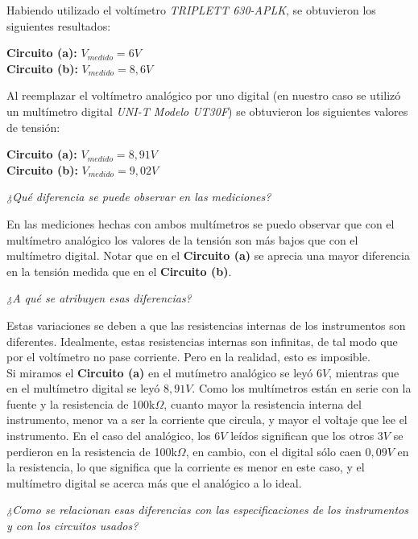 \documentclass{article}
\begin{document}
\noindent Habiendo utilizado el voltímetro \textit{TRIPLETT 630-APLK}, se obtuvieron los siguientes resultados:
\bigskip

	\indent \textbf{Circuito (a):} $V_{medido} = 6V$ \smallskip\\
	\indent \textbf{Circuito (b):} $V_{medido} = 8,6V$ \\
	\medskip

	Al reemplazar el voltímetro analógico por uno digital (en nuestro caso se utilizó un multímetro digital \textit{UNI-T Modelo UT30F}) se obtuvieron los siguientes valores de tensión:
\bigskip

	\indent \textbf{Circuito (a):} $V_{medido} = 8,91V$ \smallskip\\
	\indent \textbf{Circuito (b):} $V_{medido} = 9,02V$ \\
	\bigskip

\newpage
\textit{¿Qué diferencia se puede observar en las mediciones?}
\medskip

	En las mediciones hechas con ambos multímetros se puedo observar que con el multímetro analógico los valores de la tensión son más bajos que con el multímetro digital. Notar que en el \textbf{Circuito (a)} se aprecia una mayor diferencia en la tensión medida que en el 
 \textbf{Circuito (b)}.
\bigskip

\textit{¿A qué se atribuyen esas diferencias?}
\medskip
	
	Estas variaciones se deben a que las resistencias internas de los instrumentos son diferentes. Idealmente, estas resistencias internas son infinitas, de tal modo que por el voltímetro no pase corriente. Pero en la realidad, esto es imposible.\\
\indent Si miramos el \textbf{Circuito (a)} en el mutímetro analógico se leyó $6V$, mientras que en el multímetro digital se leyó $8,91V$. Como los multímetros están en serie con la fuente y la resistencia de 100k$\Omega$, cuanto mayor la resistencia interna del instrumento, menor va a ser la corriente que circula, y mayor el voltaje que lee el instrumento. En el caso del analógico, los $6V$ leídos significan que los otros $3V$ se perdieron en la resistencia de 100k$\Omega$, en cambio, con el digital sólo caen $0,09V$ en la resistencia, lo que significa que la corriente es menor en este caso, y el multímetro digital se acerca más que el analógico a lo ideal.
\bigskip

\textit{¿Como se relacionan esas diferencias con las especificaciones de los instrumentos y con los circuitos usados?}
\medskip
\end{document}
